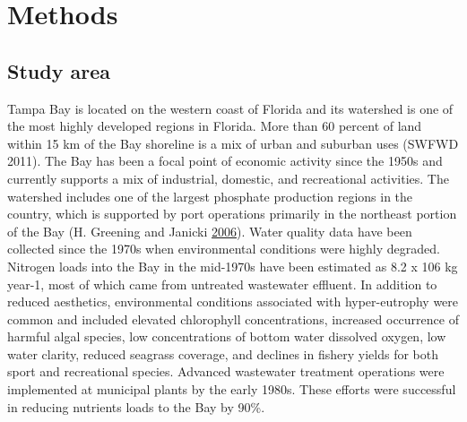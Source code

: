 \documentclass[]{article}
\begin{document}
\section{Methods}\label{methods}

\subsection{Study area}\label{study-area}

Tampa Bay is located on the western coast of Florida and its watershed
is one of the most highly developed regions in Florida. More than 60
percent of land within 15 km of the Bay shoreline is a mix of urban and
suburban uses (SWFWD 2011). The Bay has been a focal point of economic
activity since the 1950s and currently supports a mix of industrial,
domestic, and recreational activities. The watershed includes one of the
largest phosphate production regions in the country, which is supported
by port operations primarily in the northeast portion of the Bay (H.
Greening and Janicki \protect\hyperlink{ref-Greening06}{2006}). Water
quality data have been collected since the 1970s when environmental
conditions were highly degraded. Nitrogen loads into the Bay in the
mid-1970s have been estimated as 8.2 x 106 kg year-1, most of which came
from untreated wastewater effluent. In addition to reduced aesthetics,
environmental conditions associated with hyper-eutrophy were common and
included elevated chlorophyll concentrations, increased occurrence of
harmful algal species, low concentrations of bottom water dissolved
oxygen, low water clarity, reduced seagrass coverage, and declines in
fishery yields for both sport and recreational species. Advanced
wastewater treatment operations were implemented at municipal plants by
the early 1980s. These efforts were successful in reducing nutrients
loads to the Bay by 90\%.
\end{document}
